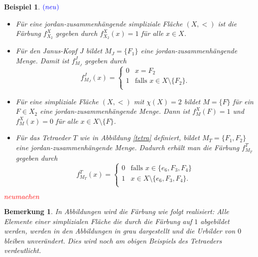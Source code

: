 \documentclass[12pt,titlepage]{article}
\newtheorem{bsp}{Beispiel}[section]
\newtheorem{bemerkung}{Bemerkung}[section]
\begin{document}
\begin{bsp}$\textcolor{blue}{(neu)}$
\begin{itemize}
\item Für eine jordan-zusammenhängende simpliziale Fläche $(X,<)$ ist die Färbung $f^X_{X_2}$ gegeben durch $f_{X_2}^X(x)=1$ für alle $x \in X$.

\item Für den Janus-Kopf $J$ bildet $M_J=\{F_1\}$ eine jordan-zusammenhängende Menge. Damit ist $f^J_{M_J}$ gegeben durch
\[
f^J_{M_J}(x)=\begin{cases}
0 &x=F_2\\
1 & \text{falls } x\in X\setminus \{F_2\}.\\
		\end{cases}
\]
\item Für eine simpliziale Fläche $(X,<)$ mit $\chi(X)=2$ bildet $M=\{F\}$ für ein $F \in X_2$ eine jordan-zusammenhängende Menge. Dann ist $f_M^X(F)=1$ und $f_M^X(x)=0$ für alle $x \in X\setminus \{F\}$.
\item Für das Tetraeder $T$ wie in Abbildung \ref{tetra} definiert, bildet $M_T=\{F_1,F_2\}$ eine jordan-zusammenhängende Menge. Dadurch erhält man die Färbung $f^T_{M_T}$ gegeben durch
\[
f^T_{M_T}(x)=\begin{cases}
		0 & \text{falls } x  \in \{e_6,F_3,F_4\}\\
1 &x \in X\setminus \{e_6,F_3,F_4\}.\\
		\end{cases}
\]

\end{itemize}
\end{bsp}
$\textcolor{red}{neumachen}$
\begin{bemerkung}
In Abbildungen wird die Färbung wie folgt realisiert:
Alle Elemente einer simplizialen Fläche die durch die Färbung auf $1$ abgebildet werden, werden in den Abbildungen in grau dargestellt und die Urbilder von $0$ bleiben unverändert. Dies wird noch am obigen Beispiels des Tetraeders verdeutlicht.
\end{bemerkung}
\end{document}
